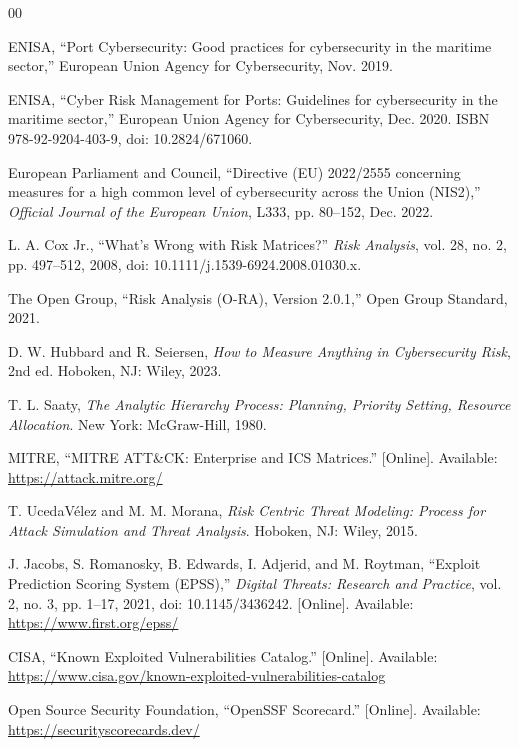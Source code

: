 \documentclass[conference]{IEEEtran}
\begin{document}
\begin{thebibliography}{00}

ENISA, ``Port Cybersecurity: Good practices for cybersecurity in the maritime
sector,'' European Union Agency for Cybersecurity, Nov. 2019.

ENISA, ``Cyber Risk Management for Ports: Guidelines for cybersecurity in the
maritime sector,'' European Union Agency for Cybersecurity, Dec. 2020.
ISBN 978-92-9204-403-9, doi: 10.2824/671060.

European Parliament and Council, ``Directive (EU) 2022/2555 concerning measures for
a high common level of cybersecurity across the Union (NIS2),'' \emph{Official
Journal of the European Union}, L333, pp. 80--152, Dec. 2022.

L. A. Cox Jr., ``What's Wrong with Risk Matrices?'' \emph{Risk Analysis}, vol. 28,
no. 2, pp. 497--512, 2008, doi: 10.1111/j.1539-6924.2008.01030.x.

The Open Group, ``Risk Analysis (O-RA), Version 2.0.1,'' Open Group Standard, 2021.

D. W. Hubbard and R. Seiersen, \emph{How to Measure Anything in Cybersecurity
Risk}, 2nd ed. Hoboken, NJ: Wiley, 2023.

T. L. Saaty, \emph{The Analytic Hierarchy Process: Planning, Priority Setting,
Resource Allocation}. New York: McGraw-Hill, 1980.

MITRE, ``MITRE ATT\&CK: Enterprise and ICS Matrices.'' [Online]. Available:
\url{https://attack.mitre.org/}

T. UcedaVélez and M. M. Morana, \emph{Risk Centric Threat Modeling: Process for
Attack Simulation and Threat Analysis}. Hoboken, NJ: Wiley, 2015.

J. Jacobs, S. Romanosky, B. Edwards, I. Adjerid, and M. Roytman, ``Exploit
Prediction Scoring System (EPSS),'' \emph{Digital Threats: Research and Practice},
vol. 2, no. 3, pp. 1--17, 2021, doi: 10.1145/3436242. [Online]. Available:
\url{https://www.first.org/epss/}

CISA, ``Known Exploited Vulnerabilities Catalog.'' [Online]. Available:
\url{https://www.cisa.gov/known-exploited-vulnerabilities-catalog}

Open Source Security Foundation, ``OpenSSF Scorecard.'' [Online]. Available:
\url{https://securityscorecards.dev/}


\end{thebibliography}
\end{document}

